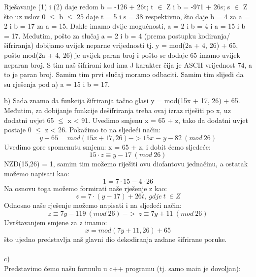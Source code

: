 \documentclass[12pt]{article}
\begin{document}
\begin{enumerate}
Rješavanje (1) i (2) daje redom b = -126 + 26t; t ${\in}$ Z i b = -971 + 26s; s ${\in}$ Z
što uz uslov 0 ${\leq}$ b ${\leq}$ 25 daje t = 5 i s = 38 respektivno, što
daje b = 4 za a = 2 i b = 17 za a = 15. Dakle imamo dvije mogućnosti,
a = 2 i b = 4 i a = 15 i b = 17.
Međutim, pošto za slučaj a = 2 i b = 4 (prema postupku kodiranja/šifriranja) dobijamo uvijek neparne vrijednosti tj.
y = mod(2a + 4, 26) + 65, pošto mod(2a + 4, 26) je uvijek paran broj i pošto se dodaje 65 imamo uvijek neparan broj.
S tim naš šifrirani kod ima J karakter čija je ASCII vrijednost 74, a to je paran broj. Samim tim prvi slučaj moramo
odbaciti. Samim tim slijedi da su rješenja pod a) a = 15 i b = 17.
\newpage

b) 
Sada znamo da funkcija šifriranja tačno glasi y = mod(15x + 17, 26) + 65. Međutim, za dobijanje funkcije dešifriranja treba ovaj izraz riješiti po x, uz
dodatni uvjet 65 ${\leq}$ x < 91. Uvedimo smjenu x = 65 + z, tako da
dodatni uvjet postaje 0 ${\leq}$ z < 26. Pokažimo to na sljedeći način: 
\begin{equation*}
y - 65 = mod(15x+17,26) -> 15x \equiv y - 82~(mod~ 26)
\end{equation*}
Uvedimo gore spomenutu smjenu: x = 65 + z, i dobit ćemo sljedeće:
\begin{equation*}
15 \cdot z \equiv y - 17 ~(mod~26)
\end{equation*}
NZD(15,26) = 1, samim tim možemo riješiti ovu diofantovu jednačinu, a ostatak možemo napisati kao:
\begin{equation*}
1 = 7 \cdot 15 - 4 \cdot 26
\end{equation*}
Na osnovu toga možemo formirati naše rješenje z kao:
\begin{equation*}
z = 7 \cdot (y - 17) + 26t,~gdje~t~\in Z 
\end{equation*}
Odnosno naše rješenje možemo napisati i na sljedeći način:
\begin{equation*}
z \equiv 7y - 119~(mod~26)~->~z \equiv 7y + 11~(mod~26) 
\end{equation*}
Uvrštavanjem smjene za z imamo:
\begin{equation*}
x = mod(7y + 11, 26) + 65
\end{equation*}
što ujedno predstavlja naš glavni dio dekodiranja zadane šifrirane poruke.
\\
\\
c)
\\

Predstavimo ćemo našu formulu u c++ programu (tj. samo main je dovoljan):


\end{enumerate}
\end{document}
